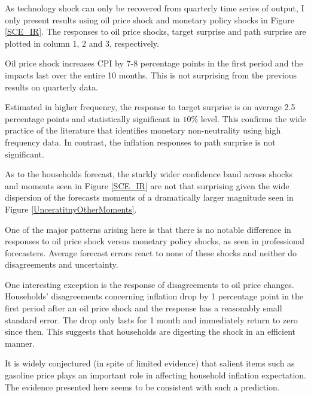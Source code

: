 \documentclass[]{article}
\begin{document}
	As technology shock can only be recovered from quarterly time series of output, I only present results using oil price shock and monetary policy shocks in Figure \ref{SCE_IR}. The responses to oil price shocks, target surprise and path surprise are plotted in column 1, 2 and 3, respectively. 
	
	Oil price shock increases CPI by  7-8 percentage points in the first period and the impacts last over the entire 10 months. This is not surprising from the previous results on quarterly data. 
	
	Estimated in higher frequency, the response to target surprise is on average 2.5 percentage points and statistically significant in $10\%$ level. This confirms the wide practice of the literature that identifies monetary non-neutrality using high frequency data. In contrast, the inflation responses to path surprise is not significant. 
	
	As to the households forecast, the starkly wider confidence band across  shocks and moments seen in Figure \ref{SCE_IR} are not that surprising given the wide dispersion of the forecasts moments of a dramatically larger magnitude seen in Figure \ref{UnceratitnyOtherMoments}.  
	
	One of the major patterns arising here is that there is no notable difference in responses to oil price shock versus monetary policy shocks, as seen in professional forecasters.  Average forecast errors react to none of these shocks and neither do disagreements and uncertainty.  
	
	One interesting exception is the response of disagreements to oil price changes. Households' disagreements concerning inflation drop by 1 percentage point in the first period after an oil price shock and the response has a reasonably small standard error. The drop only lasts for 1 month and immediately return to zero since then. This suggests that households are digesting the shock in an efficient manner.  
	
	It is widely conjectured (in spite of limited evidence) that salient items such as gasoline price plays an important role in affecting household inflation expectation. The evidence presented here seems to be consistent with such a prediction. 
	
	
	
\end{document}
